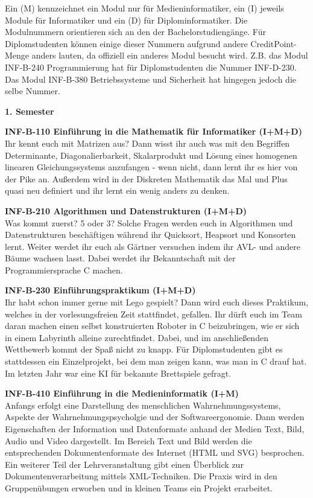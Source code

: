 
Ein (M) kennzeichnet ein Modul nur für Medieninformatiker, ein (I) jeweils Module für Informatiker und ein (D) für Diplominformatiker.
Die Modulnummern orientieren sich an den der Bachelorstudiengänge.
Für Diplomstudenten können einige dieser Nummern aufgrund andere CreditPoint-Menge anders lauten, da offiziell ein anderes Modul besucht wird.
Z.B. das Modul INF-B-240 Programmierung hat für Diplomstudenten die Nummer INF-D-230.
Das Modul INF-B-380 Betriebssysteme und Sicherheit hat hingegen jedoch die selbe Nummer.

\textbf{1. Semester}

\textbf{INF-B-110 Einführung in die Mathematik für Informatiker (I+M+D)} \\
Ihr kennt euch mit Matrizen aus?
Dann wisst ihr auch was mit den Begriffen Determinante, Diagonalierbarkeit, Skalarprodukt und Lösung eines homogenen linearen Gleichungssystems anzufangen - wenn nicht, dann lernt ihr es hier von der Pike an.
Außerdem wird in der Diskreten Mathematik das Mal und Plus quasi neu definiert und ihr lernt ein wenig anders zu denken.

\textbf{INF-B-210 Algorithmen und Datenstrukturen (I+M+D)} \\
Was kommt zuerst?
5 oder 3?
Solche Fragen werden euch in Algorithmen und Datenstrukturen beschäftigen während ihr Quicksort, Heapsort und Konsorten lernt.
Weiter werdet ihr euch als Gärtner versuchen indem ihr AVL- und andere Bäume wachsen lasst.
Dabei werdet ihr Bekanntschaft mit der Programmiersprache C machen.

\textbf{INF-B-230 Einführungspraktikum (I+M+D)} \\
Ihr habt schon immer gerne mit Lego gespielt?
Dann wird euch dieses Praktikum, welches in der vorlesungsfreien Zeit stattfindet, gefallen.
Ihr dürft euch im Team daran machen einen selbst konstruierten Roboter in C beizubringen, wie er sich in einem Labyrinth alleine zurechtfindet.
Dabei, und im anschließenden Wettbewerb kommt der Spaß nicht zu knapp.
Für Diplomstudenten gibt es stattdessen ein Einzelprojekt, bei dem man zeigen kann, was man in C drauf hat.
Im letzten Jahr war eine KI für bekannte Brettspiele gefragt.

\textbf{INF-B-410 Einführung in die Medieninformatik (I+M)} \\
Anfangs erfolgt eine Darstellung des menschlichen Wahrnehmungssystems, Aspekte der Wahrnehmungspsycholgie und der Softwareergonomie.
Dann werden Eigenschaften der Information und Datenformate anhand der Medien Text, Bild, Audio und Video dargestellt.
Im Bereich Text und Bild werden die entsprechenden Dokumentenformate des Internet (HTML und SVG) besprochen.
Ein weiterer Teil der Lehrveranstaltung gibt einen Überblick zur Dokumentenverarbeitung mittels XML-Techniken.
Die Praxis wird in den Gruppenübungen erworben und in kleinen Teams ein Projekt erarbeitet.

